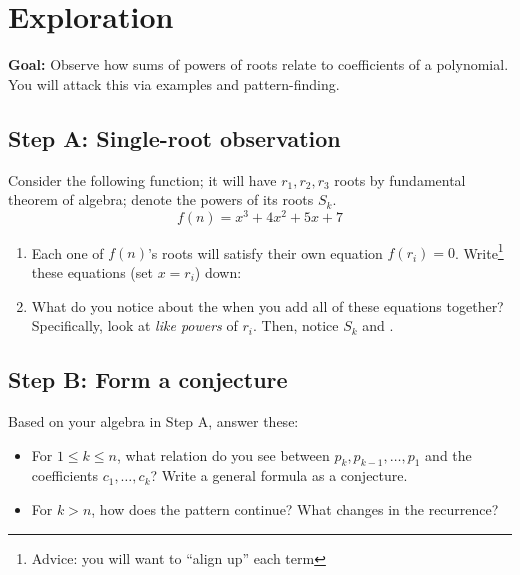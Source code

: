 \documentclass{tufte-handout}
\begin{document}
\section*{Exploration}
\textbf{Goal:} Observe how sums of powers of roots relate to coefficients of a polynomial.
You will attack this via examples and pattern-finding.

\subsection*{Step A: Single-root observation}
    Consider the following function; it will have $r_1, r_2, r_3$ roots by fundamental theorem of algebra; denote the powers of its roots $S_k$.
    \[
        f(n)=x^3+4x^2+5x+7
    \]
\begin{enumerate}[label=\textbf{A\arabic*.}, leftmargin=*, nosep]
    \item Each one of $f(n)$'s roots will satisfy their own equation $f(r_i)=0$. Write\footnote{Advice: you will want to ``align up'' each term} these equations (set $x=r_i$) down:
    \vspace{9em}
    \item What do you notice about the when you add all of these equations together? Specifically, look at \textit{like powers} of $r_i$. Then, notice $S_k$ and .

\end{enumerate}

\subsection*{Step B: Form a conjecture}
Based on your algebra in Step A, answer these:
\begin{itemize}
  \item For $1\le k\le n$, what relation do you see between $p_k, p_{k-1},\dots,p_1$ and the coefficients $c_1,\dots,c_k$? Write a general formula as a conjecture.
  \item For $k>n$, how does the pattern continue? What changes in the recurrence?
\end{itemize}
\end{document}
